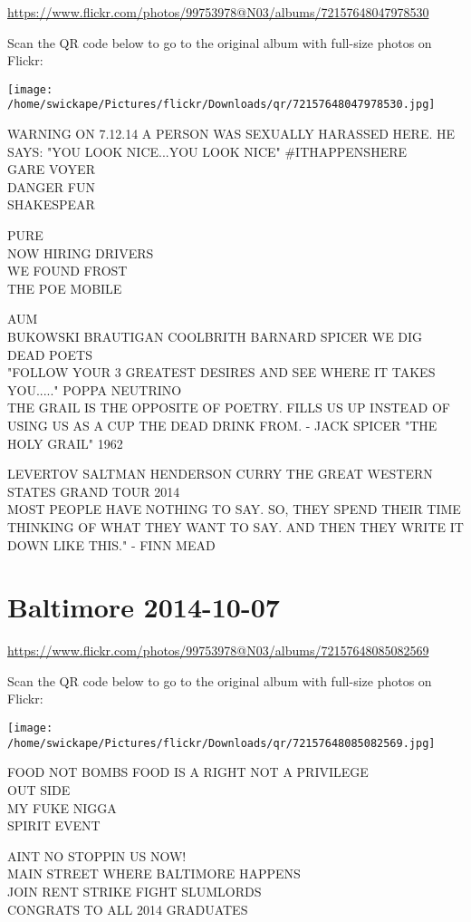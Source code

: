 \documentclass[10pt,letterpaper]{article}
\begin{document}
\url{https://www.flickr.com/photos/99753978@N03/albums/72157648047978530}

Scan the QR code below to go to the original album with full-size photos on Flickr:

\texttt{[image: /home/swickape/Pictures/flickr/Downloads/qr/72157648047978530.jpg]}


WARNING ON 7.12.14 A PERSON WAS SEXUALLY HARASSED HERE.  HE SAYS: "YOU LOOK NICE...YOU LOOK NICE" \#ITHAPPENSHERE\\
GARE VOYER\\
DANGER FUN\\
SHAKESPEAR

PURE\\
NOW HIRING DRIVERS\\
WE FOUND FROST\\
THE POE MOBILE

AUM\\
BUKOWSKI BRAUTIGAN COOLBRITH BARNARD SPICER WE DIG DEAD POETS\\
"FOLLOW YOUR 3 GREATEST DESIRES AND SEE WHERE IT TAKES YOU....." POPPA NEUTRINO\\
THE GRAIL IS THE OPPOSITE OF POETRY.  FILLS US UP INSTEAD OF USING US AS A CUP THE DEAD DRINK FROM.  {-} JACK SPICER "THE HOLY GRAIL" 1962

LEVERTOV SALTMAN HENDERSON CURRY THE GREAT WESTERN STATES GRAND TOUR 2014\\
MOST PEOPLE HAVE NOTHING TO SAY.  SO, THEY SPEND THEIR TIME THINKING OF WHAT THEY WANT TO SAY.  AND THEN THEY WRITE IT DOWN LIKE THIS." {-} FINN MEAD


\section*{Baltimore 2014-10-07}

\url{https://www.flickr.com/photos/99753978@N03/albums/72157648085082569}

Scan the QR code below to go to the original album with full-size photos on Flickr:

\texttt{[image: /home/swickape/Pictures/flickr/Downloads/qr/72157648085082569.jpg]}


FOOD NOT BOMBS FOOD IS A RIGHT NOT A PRIVILEGE\\
OUT SIDE\\
MY FUKE NIGGA\\
SPIRIT EVENT

AINT NO STOPPIN US NOW!\\
MAIN STREET WHERE BALTIMORE HAPPENS\\
JOIN RENT STRIKE FIGHT SLUMLORDS\\
CONGRATS TO ALL 2014 GRADUATES
\end{document}

